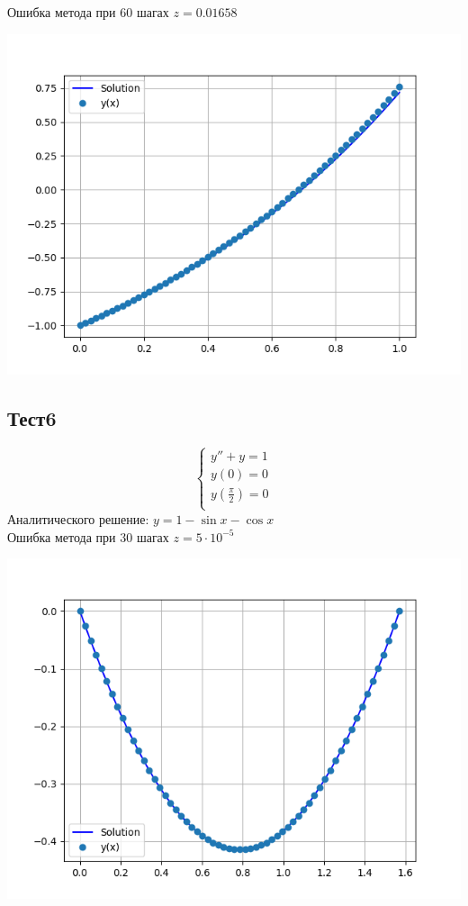 \documentclass[a4paper,12pt,titlepage,finall]{article}
\begin{document}
Ошибка метода при 60 шагах $z = 0.01658$

\includegraphics[width=450pt]{Graphics/2.1.png}\newline
\newpage
\subsection{Тест6}
\begin{equation*}
 \begin{cases}
   y'' + y = 1\\
   y(0) = 0\\
   y(\frac{\pi}{2}) = 0\\
 \end{cases}
\end{equation*}
Аналитического решение: $y = 1 - \sin{x} - \cos{x}$\\

Ошибка метода при 30 шагах $z = 5 \cdot 10^{-5}$

\includegraphics[width=450pt]{Graphics/2.2.png}\newline
\newpage
\end{document}
